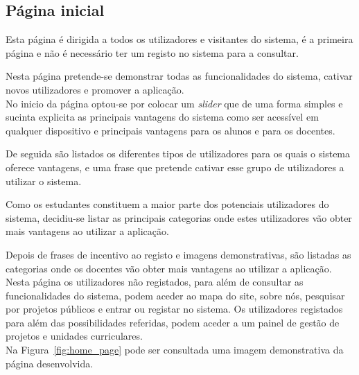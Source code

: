 \subsection{Página inicial}

Esta página é dirigida a todos os utilizadores e visitantes do sistema, é a primeira página e não é necessário ter um registo no sistema para a consultar.

Nesta página pretende-se demonstrar todas as funcionalidades do sistema, cativar novos utilizadores e promover a aplicação.\\

No inicio da página optou-se por colocar um \textit{slider} que de uma forma simples e sucinta explicita as principais vantagens do sistema como ser acessível em qualquer dispositivo e principais vantagens para os alunos e para os docentes.

De seguida são listados os diferentes tipos de utilizadores para os quais o sistema oferece vantagens, e uma frase que pretende cativar esse grupo de utilizadores a utilizar o sistema.

Como os estudantes constituem a maior parte dos potenciais utilizadores do sistema, decidiu-se listar as principais categorias onde estes utilizadores vão obter mais vantagens ao utilizar a aplicação.

Depois de frases de incentivo ao registo e imagens demonstrativas, são listadas as categorias onde os docentes vão obter mais vantagens ao utilizar a aplicação.\\

Nesta página os utilizadores não registados, para além de consultar as funcionalidades do sistema, podem aceder ao mapa do site, sobre nós, pesquisar por projetos públicos e entrar ou registar no sistema.
Os utilizadores registados para além das possibilidades referidas, podem aceder a um painel de gestão de projetos e unidades curriculares.\\ 

Na Figura~\ref{fig:home_page} pode ser consultada uma imagem demonstrativa da página desenvolvida.\\

